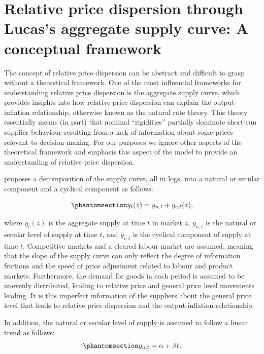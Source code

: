 \documentclass[
  letterpaper,
  DIV=11,
  numbers=noendperiod]{scrartcl}
\begin{document}
\section{Relative price dispersion through Lucas's aggregate supply
curve: A conceptual
framework}\label{relative-price-dispersion-through-lucass-aggregate-supply-curve-a-conceptual-framework}

The concept of relative price dispersion can be abstract and difficult
to grasp without a theoretical framework. One of the most influential
frameworks for understanding relative price dispersion is the
\citet{lucas1973} aggregate supply curve, which provides insights into
how relative price dispersion can explain the output-inflation
relationship, otherwise known as the natural rate theory. This theory
essentially means (in part) that nominal ``rigidities'' partially
dominate short-run supplier behaviour resulting from a lack of
information about some prices relevant to decision making. For our
purposes we ignore other aspects of the theoretical framework and
emphasis this aspect of the model to provide an understanding of
relative price dispersion.

\citet{lucas1973} proposes a decomposition of the supply curve, all in
logs, into a natural or secular component and a cyclical component as
follows:

\begin{equation}\phantomsection\label{eq-lucas_supply_curve}{y_t(z) = y_{n,t} + y_{c,t}(z), }\end{equation}

where \(y_t(z)\) is the aggregate supply at time \(t\) in market \(z\),
\(y_{n,t}\) is the natural or secular level of supply at time \(t\), and
\(y_{c,t}\) is the cyclical component of supply at time \(t\).
Competitive markets and a cleared labour market are assumed, meaning
that the slope of the supply curve can only reflect the degree of
information frictions and the speed of price adjustment related to
labour and product markets. Furthermore, the demand for goods in each
period is assumed to be unevenly distributed, leading to relative price
and general price level movements leading. It is this imperfect
information of the suppliers about the general price level that leads to
relative price dispersion and the output-inflation relationship.

In addition, the natural or secular level of supply is assumed to follow
a linear trend as follows:
\begin{equation}\phantomsection\label{eq-natural_supply}{ y_{n,t} = \alpha + \beta t, }\end{equation}
\end{document}
